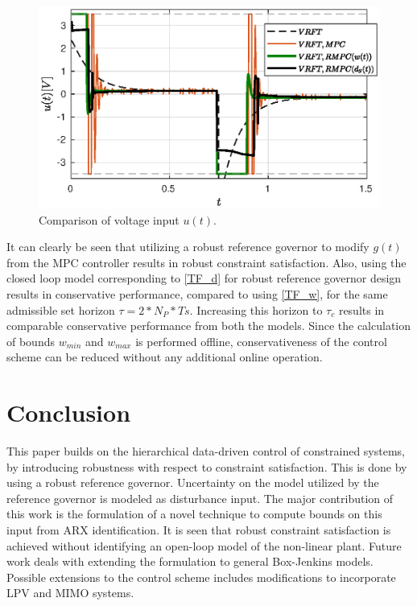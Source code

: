 \documentclass[letterpaper, 10 pt, conference]{ieeeconf}  %
\begin{document}
	\begin{figure}[t]
		\hspace{-5pt}
		\includegraphics[scale = 0.60]{VRFT_vs_MPC_u.eps}
		\caption{Comparison of voltage input $u(t)$.}
		\label{VRFT_u}
	\end{figure} 
	It can clearly be seen that utilizing a robust reference governor to modify $g(t)$ from the MPC controller results in robust constraint satisfaction. Also, using the closed loop model corresponding to \eqref{TF_d} for robust reference governor design results in conservative performance, compared to using \eqref{TF_w}, for the same admissible set horizon $\tau = 2*N_P*Ts$. Increasing this horizon to $\tau_c$ results in comparable conservative performance from both the models. Since the calculation of bounds $w_{min}$ and $w_{max}$ is performed offline, conservativeness of the control scheme can be reduced without any additional online operation.
	
	\section{Conclusion}
	This paper builds on the hierarchical data-driven control of constrained systems, by introducing robustness with respect to constraint satisfaction. This is done by using a robust reference governor.  Uncertainty on the model utilized by the reference governor is modeled as disturbance input. 
	The major contribution of this work is the formulation of a novel technique to compute bounds on this input from ARX identification. It is seen that robust constraint satisfaction is achieved without identifying an open-loop model of the non-linear plant. Future work deals with extending the formulation to general Box-Jenkins models. Possible extensions to the control scheme includes modifications to incorporate LPV and MIMO systems.

	
                                                             

\end{document}
